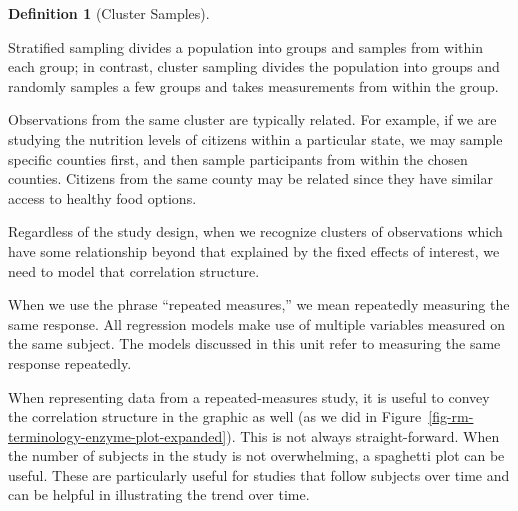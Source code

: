 \documentclass[
  letterpaper,
  DIV=11,
  numbers=noendperiod]{scrreprt}
\theoremstyle{definition}
\theoremstyle{definition}
\newtheorem{definition}{Definition}[chapter]
\theoremstyle{remark}
\begin{document}
\begin{definition}[Cluster
Samples]\protect\hypertarget{def-cluster-samples}{}\label{def-cluster-samples}

Stratified sampling divides a population into groups and samples from
within each group; in contrast, cluster sampling divides the population
into groups and randomly samples a few groups and takes measurements
from within the group.

\end{definition}

Observations from the same cluster are typically related. For example,
if we are studying the nutrition levels of citizens within a particular
state, we may sample specific counties first, and then sample
participants from within the chosen counties. Citizens from the same
county may be related since they have similar access to healthy food
options.

Regardless of the study design, when we recognize clusters of
observations which have some relationship beyond that explained by the
fixed effects of interest, we need to model that correlation structure.

\begin{tcolorbox}[enhanced jigsaw, bottomrule=.15mm, titlerule=0mm, bottomtitle=1mm, colback=white, coltitle=black, rightrule=.15mm, leftrule=.75mm, toprule=.15mm, toptitle=1mm, left=2mm, opacityback=0, colframe=quarto-callout-note-color-frame, breakable, title=\textcolor{quarto-callout-note-color}{\faInfo}\hspace{0.5em}{Note}, arc=.35mm, colbacktitle=quarto-callout-note-color!10!white, opacitybacktitle=0.6]

When we use the phrase ``repeated measures,'' we mean repeatedly
measuring the same response. All regression models make use of multiple
variables measured on the same subject. The models discussed in this
unit refer to measuring the same response repeatedly.

\end{tcolorbox}

When representing data from a repeated-measures study, it is useful to
convey the correlation structure in the graphic as well (as we did in
Figure~\ref{fig-rm-terminology-enzyme-plot-expanded}). This is not
always straight-forward. When the number of subjects in the study is not
overwhelming, a spaghetti plot can be useful. These are particularly
useful for studies that follow subjects over time and can be helpful in
illustrating the trend over time.
\end{document}
